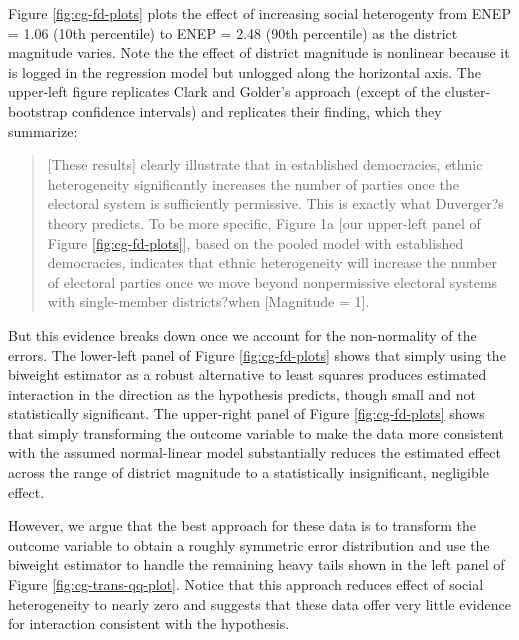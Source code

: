 \documentclass[12pt]{article}
\begin{document}
Figure \ref{fig:cg-fd-plots} plots the effect of increasing social heterogenty from ENEP = 1.06 (10th percentile) to ENEP = 2.48 (90th percentile) as the district magnitude varies. Note the the effect of district magnitude is nonlinear because it is logged in the regression model but unlogged along the horizontal axis. The upper-left figure replicates Clark and Golder's approach (except of the cluster-bootstrap confidence intervals) and replicates their finding, which they summarize:

\begin{quote}
[These results] clearly illustrate that in established democracies, ethnic heterogeneity significantly increases the number of parties once the electoral system is sufficiently permissive. This is exactly what Duverger?s theory predicts. To be more specific, Figure 1a [our upper-left panel of Figure \ref{fig:cg-fd-plots}], based on the pooled model with established democracies, indicates that ethnic heterogeneity will increase the number of electoral parties once we move beyond nonpermissive electoral systems with single-member districts?when [Magnitude = 1].
\end{quote}

But this evidence breaks down once we account for the non-normality of the errors. The lower-left panel of Figure \ref{fig:cg-fd-plots} shows that simply using the biweight estimator as a robust alternative to least squares produces estimated interaction in the  direction as the hypothesis predicts, though small and not statistically significant. The upper-right panel of Figure \ref{fig:cg-fd-plots} shows that simply transforming the outcome variable to make the data more consistent with the assumed normal-linear model substantially reduces the estimated effect across the range of district magnitude to a statistically insignificant, negligible effect.

However, we argue that the best approach for these data is to transform the outcome variable to obtain a roughly symmetric error distribution and use the biweight estimator to handle the remaining heavy tails shown in the left panel of Figure \ref{fig:cg-trans-qq-plot}. Notice that this approach reduces effect of social heterogeneity to nearly zero and suggests that these data offer very little evidence for interaction consistent with the hypothesis.
\end{document}
